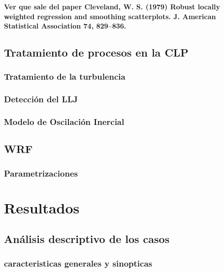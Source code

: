 \documentclass[12pt,spanish,oneside]{book}
\begin{document}
\textbf{Ver que sale del paper Cleveland, W. S. (1979) Robust locally
weighted regression and smoothing scatterplots. J. American Statistical
Association 74, 829--836.}

\section{Tratamiento de procesos en la
CLP}\label{tratamiento-de-procesos-en-la-clp}

\subsection{Tratamiento de la
turbulencia}\label{tratamiento-de-la-turbulencia}

\subsection{Detección del LLJ}\label{deteccion-del-llj}

\subsection{Modelo de Oscilación
Inercial}\label{modelo-de-oscilacion-inercial}

\section{WRF}\label{wrf}

\subsection{Parametrizaciones}\label{parametrizaciones}

\chapter{Resultados}\label{resultados}

\section{Análisis descriptivo de los
casos}\label{analisis-descriptivo-de-los-casos}

\subsection{caracteristicas generales y
sinopticas}\label{caracteristicas-generales-y-sinopticas}
\end{document}
